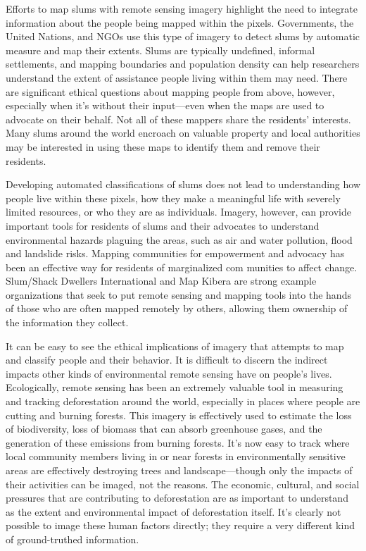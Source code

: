 \begin{itemize}
\begin{itemized}
Efforts to map slums with remote sensing imagery highlight the need to
integrate information about the people being mapped within the pixels.
Governments, the United Nations, and NGOs use this type of imagery to
detect slums by automatic measure and map their extents. Slums are typically
undefined, informal settlements, and mapping boundaries and population
density can help researchers understand the extent of assistance people
living within them may need. There are significant ethical questions about
mapping people from above, however, especially when it's without their
input—even when the maps are used to advocate on their behalf. Not all of
these mappers share the residents' interests. Many slums around the world
encroach on valuable property and local authorities may be interested in
using these maps to identify them and remove their residents. 

Developing automated classifications of slums does not lead to understanding how people
live within these pixels, how they make a meaningful life with severely
limited resources, or who they are as individuals. Imagery, however, can
provide important tools for residents of slums and their advocates to understand
environmental hazards plaguing the areas, such as air and water pollution,
flood and landslide risks. Mapping communities for empowerment
and advocacy has been an effective way for residents of marginalized com
munities to affect change. Slum/Shack Dwellers International and Map
Kibera are strong example organizations that seek to put remote sensing
and mapping tools into the hands of those who are often mapped remotely
by others, allowing them ownership of the information they collect.

It can be easy to see the ethical implications of imagery that attempts to
map and classify people and their behavior. It is difficult to discern the
indirect impacts other kinds of environmental remote sensing have on
people's lives. Ecologically, remote sensing has been an extremely valuable
tool in measuring and tracking deforestation around the world, especially
in places where people are cutting and burning forests. This imagery is
effectively used to estimate the loss of biodiversity, loss of biomass that
can absorb greenhouse gases, and the generation of these emissions from
burning forests. It's now easy to track where local community members
living in or near forests in environmentally sensitive areas are effectively
destroying trees and landscape—though only the impacts of their activities
can be imaged, not the reasons. The economic, cultural, and social pressures
that are contributing to deforestation are as important to understand
as the extent and environmental impact of deforestation itself. It's clearly
not possible to image these human factors directly; they require a very different
kind of ground-truthed information.


\end{itemized}
\end{itemize}
